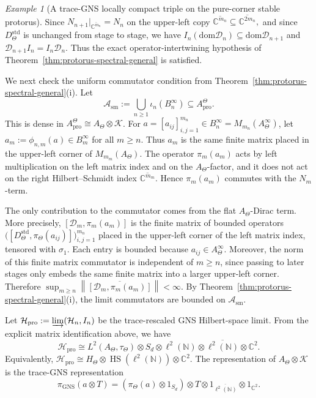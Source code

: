 \documentclass[11pt]{amsart}
\theoremstyle{definition}
\theoremstyle{remark}
\newtheorem{example}[theorem]{Example}
\newcommand{\C}{\mathbb C}
\newcommand{\N}{\mathbb N}
\newcommand{\K}{\ensuremath{\mathcal{K}}}
\newcommand{\ex}{\mathrm{pro}}
\newcommand{\dom}{\mathrm{dom}}
\begin{document}
\begin{example}[A trace-GNS locally compact triple on the pure-corner stable protorus]
Since $N_{n+1}|_{\overline{\C^{m_n}}}=N_n$
on the upper-left copy $\overline{\C^{m_n}}\subseteq\overline{\C^{2m_n}},$
and since $D_\Theta^{\mathrm{std}}$ is unchanged from stage to stage, we have $I_n(\dom\mathcal D_n)\subseteq\dom\mathcal D_{n+1}$ and
$\mathcal D_{n+1}I_n=I_n\mathcal D_n.$
Thus the exact operator-intertwining hypothesis of
Theorem~\ref{thm:protorus-spectral-general} is satisfied.

We next check the uniform commutator condition from
Theorem~\ref{thm:protorus-spectral-general}\textup{(i)}. Let
\[\mathcal A_{\mathrm{sm}}
:=
\bigcup_{n\geq1}\iota_n(B_n^\infty)
\subseteq A_{\ex}^{\Theta}.\]
This is dense in $A_{\ex}^{\Theta}\cong A_\Theta\otimes\K$. For
$a=[a_{ij}]_{i,j=1}^{m_n}\in B_n^\infty=M_{m_n}(A_\Theta^\infty)$, let $a_m:=\phi_{n,m}(a)\in B_m^\infty$ for all $m\geq n$. Thus $a_m$ is the same finite matrix placed in the upper-left corner of
$M_{m_m}(A_\Theta)$. The operator $\pi_m(a_m)$ acts by left multiplication
on the left matrix index and on the $A_\Theta$-factor, and it does not act on
the right Hilbert--Schmidt index $\overline{\C^{m_m}}$. Hence
$\pi_m(a_m)$ commutes with the $N_m$-term.

The only contribution to the commutator comes from the flat $A_\Theta$-Dirac
term. More precisely, $[\mathcal D_m,\pi_m(a_m)]$
is the finite matrix of bounded operators $\bigl([D_\Theta^{\mathrm{std}},\pi_\Theta(a_{ij})]\bigr)_{i,j=1}^{m_n}$
placed in the upper-left corner of the left matrix index, tensored with
$\sigma_1$. Each entry is bounded because $a_{ij}\in A_\Theta^\infty$.
Moreover, the norm of this finite matrix commutator is independent of $m\geq n$, since passing to later stages
only embeds the same finite matrix into a larger upper-left corner. Therefore $\sup_{m\geq n}
\left\|
\overline{[\mathcal D_m,\pi_m(a_m)]}
\right\|
<\infty.$
By Theorem~\ref{thm:protorus-spectral-general}\textup{(i)}, the limit
commutators are bounded on $\mathcal A_{\mathrm{sm}}$.

Let $\mathcal H_{\ex}:=\varinjlim(\mathcal H_n,I_n)$
be the trace-rescaled GNS Hilbert-space limit. From the explicit matrix
identification above, we have
\[
\mathcal H_{\ex}
\cong
L^2(A_\Theta,\tau_\Theta)\otimes S_d
\otimes
\ell^2(\N)
\otimes
\overline{\ell^2(\N)}
\otimes
\C^2.
\]
Equivalently, $\mathcal H_{\ex}\cong H_\Theta\otimes\operatorname{HS}(\ell^2(\N))\otimes\C^2.$
The representation of $A_\Theta\otimes\K$ is the trace-GNS representation
\[
\pi_{\mathrm{GNS}}(a\otimes T)
=
(\pi_\Theta(a)\otimes1_{S_d})
\otimes
T
\otimes
1_{\overline{\ell^2(\N)}}
\otimes1_{\C^2}.
\]


\end{example}
\end{document}
